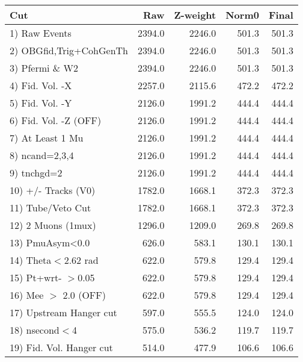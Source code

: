  \begin{table}[h!]\centering
 \begin{tabular}{||l||r|r|r|r||}
 \hline
 \hline
 Cut & Raw & Z-weight & Norm0 & Final \\
 \hline
  1) Raw Events           &      2394.0 &      2246.0 &       501.3 &       501.3 \\
  2) OBGfid,Trig+CohGenTh &      2394.0 &      2246.0 &       501.3 &       501.3 \\
  3) Pfermi \& W2         &      2394.0 &      2246.0 &       501.3 &       501.3 \\
  4) Fid. Vol. -X         &      2257.0 &      2115.6 &       472.2 &       472.2 \\
  5) Fid. Vol. -Y         &      2126.0 &      1991.2 &       444.4 &       444.4 \\
  6) Fid. Vol. -Z (OFF)   &      2126.0 &      1991.2 &       444.4 &       444.4 \\
  7) At Least 1 Mu        &      2126.0 &      1991.2 &       444.4 &       444.4 \\
  8) ncand=2,3,4          &      2126.0 &      1991.2 &       444.4 &       444.4 \\
  9) tnchgd=2             &      2126.0 &      1991.2 &       444.4 &       444.4 \\
 10) +/- Tracks (V0)      &      1782.0 &      1668.1 &       372.3 &       372.3 \\
 11) Tube/Veto Cut        &      1782.0 &      1668.1 &       372.3 &       372.3 \\
 12) 2 Muons (1mux)       &      1296.0 &      1209.0 &       269.8 &       269.8 \\
 13) PmuAsym<0.0          &       626.0 &       583.1 &       130.1 &       130.1 \\
 14) Theta$<$2.62 rad     &       622.0 &       579.8 &       129.4 &       129.4 \\
 15) Pt+wrt- $>$0.05      &       622.0 &       579.8 &       129.4 &       129.4 \\
 16) Mee $>$ 2.0  (OFF)   &       622.0 &       579.8 &       129.4 &       129.4 \\
 17) Upstream Hanger cut  &       597.0 &       555.5 &       124.0 &       124.0 \\
 18) nsecond$<$4          &       575.0 &       536.2 &       119.7 &       119.7 \\
 19) Fid. Vol. Hanger cut &       514.0 &       477.9 &       106.6 &       106.6 \\

\end{tabular}
\end{table}
